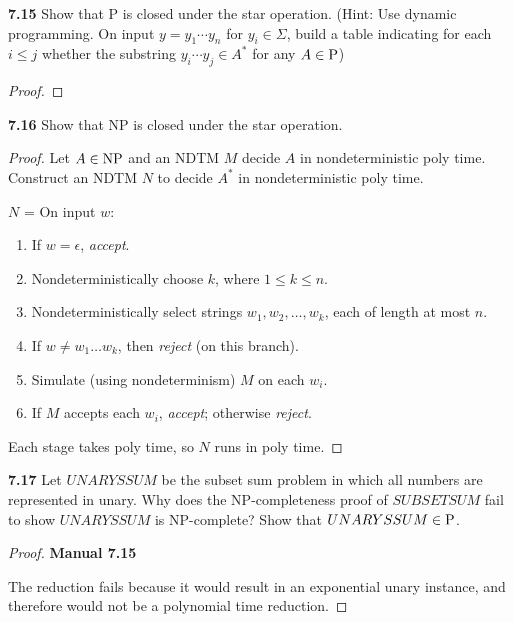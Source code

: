 \textbf{7.15} Show that P is closed under the star operation. (Hint: Use dynamic programming. On input $y=y_1 \cdots y_n$ for $y_i \in \Sigma$, build a table indicating for each $i \leq j$ whether the substring $y_i \cdots y_j \in A^*$ for any $A\in \P$)
\begin{mdframed}
\begin{proof}

\end{proof}
\end{mdframed}

\textbf{7.16} Show that NP is closed under the star operation.
\begin{mdframed}
\begin{proof}
Let $A \in \NP$ and an NDTM $M$ decide $A$ in nondeterministic poly time. Construct an NDTM $N$ to decide $A^*$ in nondeterministic poly time.

\medskip
$N$ = On input $w$:
\begin{enumerate}
\item If $w = \epsilon$, \textit{accept}.
\item Nondeterministically choose $k$, where $1 \leq k \leq n$.
\item Nondeterministically select strings $w_1, w_2, \ldots, w_k$, each of length at most $n$.
\item If $w \neq w_1 \dots w_k$, then \textit{reject} (on this branch).
\item Simulate (using nondeterminism) $M$ on each $w_i$.
\item If $M$ accepts each $w_i$, \textit{accept}; otherwise \textit{reject}.
\end{enumerate}

Each stage takes poly time, so $N$ runs in poly time.
\end{proof}
\end{mdframed}

\label{lang:UNARYSSUM_P}
\textbf{7.17} Let $UNARYSSUM$ be the subset sum problem in which all numbers are represented in unary. Why does the NP-completeness proof of $SUBSETSUM$ fail to show $UNARYSSUM$ is NP-complete? Show that $UNARYSSUM \in \P$.

\begin{mdframed}
\begin{proof}
\textbf{Manual 7.15}

The reduction fails because it would result in an exponential unary instance, and therefore would not be a polynomial time reduction.
\end{proof}
\end{mdframed}

